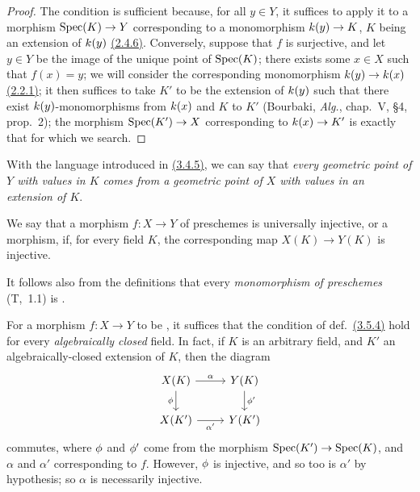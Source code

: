\begin{proof}
\label{proof-prof-1.3.5.3}
The condition is sufficient because, for all $y\in Y$, it suffices to apply it to a morphism ${\mathop{\mathrm{Spec}}\nolimits}(K)\to Y$ corresponding to a monomorphism $k(y)\to K$, $K$ being an extension of $k(y)$ \hyperref[cor-1.2.4.6]{(2.4.6)}.
Conversely, suppose that $f$ is surjective, and let $y\in Y$ be the image of the unique point of ${\mathop{\mathrm{Spec}}\nolimits}(K)$; there exists some $x\in X$ such that $f(x)=y$; we will consider the corresponding monomorphism $k(y)\to k(x)$ \hyperref[defn-1.2.2.1]{(2.2.1)}; it then suffices to take $K'$ to be the extension of $k(y)$ such that there exist $k(y)$-monomorphisms from $k(x)$ and $K$ to $K'$ (Bourbaki, \emph{Alg.}, chap.~V, §4, prop.~2); the morphism ${\mathop{\mathrm{Spec}}\nolimits}(K')\to X$ corresponding to $k(x)\to K'$ is exactly that for which we search.
\end{proof}

With the language introduced in \hyperref[env-1.3.4.5]{(3.4.5)}, we can say that \emph{every geometric point of $Y$ with values in $K$ comes from a geometric point of $X$ with values in an extension of $K$}.

\begin{defn}[3.5.4]
\label{defn-1.3.5.4}
We say that a morphism $f\colon X\to Y$ of preschemes is universally injective, or a  morphism, if, for every field $K$, the corresponding map $X(K)\to Y(K)$ is injective.
\end{defn}

It follows also from the definitions that every \emph{monomorphism of preschemes} (T,~1.1) is .

\begin{env}[3.5.5]
\label{env-1.3.5.5}
For a morphism $f\colon X\to Y$ to be , it suffices that the condition of def.~\hyperref[defn-1.3.5.4]{(3.5.4)} hold for every \emph{algebraically closed} field.
In fact, if $K$ is an arbitrary field, and $K'$ an algebraically-closed extension of $K$, then the diagram
\begin{equation*}
    \begin{tikzcd}
        X(K) \ar[r, "\alpha"] \ar[d, swap, "\vphi"]
        & Y(K) \ar[d, "\vphi'"]\\
        X(K') \ar[r, swap, "\alpha'"]
        & Y(K')
    \end{tikzcd}
\end{equation*}
commutes, where $\phi$ and $\phi'$ come from the morphism ${\mathop{\mathrm{Spec}}\nolimits}(K')\to{\mathop{\mathrm{Spec}}\nolimits}(K)$, and $\alpha$ and $\alpha'$ corresponding to $f$.
However, $\phi$ is injective, and so too is $\alpha'$ by hypothesis; so $\alpha$ is necessarily injective.
\end{env}

